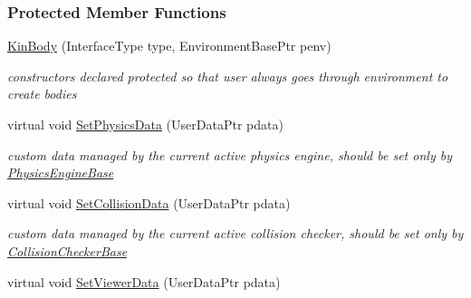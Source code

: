 \subsubsection*{Protected Member Functions}
\begin{DoxyCompactItemize}
\item 
\hypertarget{classOpenRAVE_1_1KinBody_a2f6882391018a6ec4f9a49b217703578}{
\hyperlink{classOpenRAVE_1_1KinBody_a2f6882391018a6ec4f9a49b217703578}{KinBody} (InterfaceType type, EnvironmentBasePtr penv)}
\label{classOpenRAVE_1_1KinBody_a2f6882391018a6ec4f9a49b217703578}

\begin{DoxyCompactList}\small\item\em constructors declared protected so that user always goes through environment to create bodies \item\end{DoxyCompactList}\item 
\hypertarget{classOpenRAVE_1_1KinBody_aa282fd034535ec4b05f90f9cd32bd1c9}{
virtual void \hyperlink{classOpenRAVE_1_1KinBody_aa282fd034535ec4b05f90f9cd32bd1c9}{SetPhysicsData} (UserDataPtr pdata)}
\label{classOpenRAVE_1_1KinBody_aa282fd034535ec4b05f90f9cd32bd1c9}

\begin{DoxyCompactList}\small\item\em custom data managed by the current active physics engine, should be set only by \hyperlink{classOpenRAVE_1_1PhysicsEngineBase}{PhysicsEngineBase} \item\end{DoxyCompactList}\item 
\hypertarget{classOpenRAVE_1_1KinBody_ad85bc7dc70d07b123c41b7bcad79ca34}{
virtual void \hyperlink{classOpenRAVE_1_1KinBody_ad85bc7dc70d07b123c41b7bcad79ca34}{SetCollisionData} (UserDataPtr pdata)}
\label{classOpenRAVE_1_1KinBody_ad85bc7dc70d07b123c41b7bcad79ca34}

\begin{DoxyCompactList}\small\item\em custom data managed by the current active collision checker, should be set only by \hyperlink{classOpenRAVE_1_1CollisionCheckerBase}{CollisionCheckerBase} \item\end{DoxyCompactList}\item 
\hypertarget{classOpenRAVE_1_1KinBody_aa8a85e0f120e9cbc588a8f3a555758cb}{
virtual void \hyperlink{classOpenRAVE_1_1KinBody_aa8a85e0f120e9cbc588a8f3a555758cb}{SetViewerData} (UserDataPtr pdata)}
\label{classOpenRAVE_1_1KinBody_aa8a85e0f120e9cbc588a8f3a555758cb}


\end{DoxyCompactItemize}
